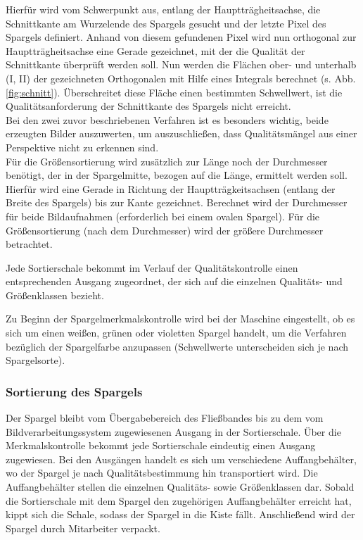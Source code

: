\documentclass{ezb}
\begin{document}
Hierfür wird vom Schwerpunkt aus, entlang der Hauptträgheitsachse, die Schnittkante am Wurzelende des Spargels gesucht und der letzte Pixel des Spargels definiert.
Anhand von diesem gefundenen Pixel wird nun orthogonal zur Hauptträgheitsachse eine Gerade gezeichnet, mit der  die Qualität der Schnittkante überprüft werden soll.
Nun werden die Flächen ober- und unterhalb (I, II) der gezeichneten Orthogonalen mit Hilfe eines Integrals berechnet (s. Abb. \ref{fig:schnitt}).
Überschreitet diese Fläche einen bestimmten Schwellwert, ist die Qualitätsanforderung der Schnittkante des Spargels nicht erreicht.\\
\linebreak
Bei den zwei zuvor beschriebenen Verfahren ist es besonders wichtig, beide erzeugten Bilder auszuwerten, um auszuschließen, dass Qualitätsmängel aus einer Perspektive nicht zu erkennen sind.\\
\linebreak
Für die Größensortierung wird zusätzlich zur Länge noch der Durchmesser benötigt, der in der Spargelmitte, bezogen auf die Länge, ermittelt werden soll. Hierfür wird eine Gerade in Richtung der Hauptträgkeitsachsen (entlang der Breite des Spargels) bis zur Kante gezeichnet. Berechnet wird der Durchmesser für beide Bildaufnahmen (erforderlich bei einem ovalen Spargel). Für die Größensortierung (nach dem Durchmesser) wird der größere Durchmesser betrachtet.

Jede Sortierschale bekommt im Verlauf der Qualitätskontrolle einen entsprechenden Ausgang zugeordnet, der sich auf die einzelnen Qualitäts- und Größenklassen bezieht.

Zu Beginn der Spargelmerkmalskontrolle wird bei der Maschine eingestellt, ob es sich um einen weißen, grünen oder violetten Spargel handelt, um die Verfahren bezüglich der Spargelfarbe anzupassen (Schwellwerte unterscheiden sich je nach Spargelsorte).

\subsubsection*{Sortierung des Spargels}
Der Spargel bleibt vom Übergabebereich des Fließbandes bis zu dem vom Bildverarbeitungssystem zugewiesenen Ausgang in der Sortierschale. Über die Merkmalskontrolle bekommt jede Sortierschale eindeutig einen Ausgang zugewiesen. Bei den Ausgängen handelt es sich um verschiedene Auffangbehälter, wo der Spargel je nach Qualitätsbestimmung hin transportiert wird. Die Auffangbehälter stellen die einzelnen Qualitäts- sowie Größenklassen dar. 
Sobald die Sortierschale mit dem Spargel den zugehörigen Auffangbehälter erreicht
hat, kippt sich die Schale, sodass der Spargel in die Kiste fällt. 
Anschließend wird der Spargel durch Mitarbeiter verpackt.
\end{document}
